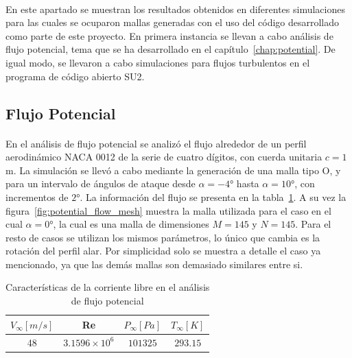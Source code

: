 \documentclass[letterpaper, openright, 12pt]{book}
\begin{document}
    \paragraph*{}
    En este apartado se muestran los resultados obtenidos en diferentes
    simulaciones para las cuales se ocuparon mallas generadas con el uso del
    código desarrollado como parte de este proyecto. En primera instancia se
    llevan a cabo análisis de flujo potencial, tema que se ha desarrollado en el
    capítulo~\ref{chap:potential}. De igual modo, se llevaron a cabo
    simulaciones para flujos turbulentos en el programa de código abierto SU2.

    \subsection{Flujo Potencial}
    \paragraph*{}
    En el análisis de flujo potencial se analizó el flujo alrededor de un perfil
    aerodinámico NACA 0012 de la serie de cuatro dígitos, con cuerda unitaria
    $c = 1$ m. La simulación se llevó a cabo mediante la generación de una malla
    tipo O, y para un intervalo de ángulos de ataque desde
    $\alpha = -4\si{\degree}$ hasta $\alpha = 10\si{\degree}$, con incrementos
    de $2\si{\degree}$. La información del flujo se presenta en la
    tabla~\ref{tabla_potencial}. A su vez la
    figura~\ref{fig:potential_flow_mesh} muestra la malla
    utilizada para el caso en el cual $\alpha = 0\si{\degree}$, la cual es una
    malla de dimensiones $M = 145$ y $N = 145$. Para el resto de casos se
    utilizan los mismos parámetros, lo único que cambia es la rotación del
    perfil alar. Por simplicidad solo se muestra a detalle el caso ya
    mencionado, ya que las demás mallas son demasiado similares entre si.

    \begin{table}[htbp!]
    \begin{center}
        \begin{tabular}{| c | c | c | c |}
        \hline
          $V_{\infty} [m / s]$ & Re & $P_{\infty} [Pa]$ & $T_{\infty} [K]$ \\
        \hline
          48 & $3.1596\times 10^{6}$ & $101 325$ & $293.15$ \\
        \hline
        \end{tabular}
        \caption{Características de la corriente libre en el análisis de flujo potencial}
    \label{tabla_potencial}
    \end{center}
    \end{table}
\end{document}
